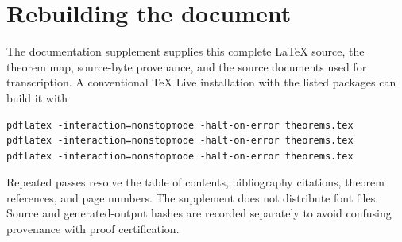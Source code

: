 \documentclass[11pt,letterpaper,oneside]{report}
\theoremstyle{komorebi}
\begin{document}
\section{Rebuilding the document}
The documentation supplement supplies this complete LaTeX source, the theorem map, source-byte provenance, and the source documents used for transcription. A conventional TeX Live installation with the listed packages can build it with
\begin{verbatim}
pdflatex -interaction=nonstopmode -halt-on-error theorems.tex
pdflatex -interaction=nonstopmode -halt-on-error theorems.tex
pdflatex -interaction=nonstopmode -halt-on-error theorems.tex
\end{verbatim}
Repeated passes resolve the table of contents, bibliography citations, theorem references, and page numbers. The supplement does not distribute font files. Source and generated-output hashes are recorded separately to avoid confusing provenance with proof certification.
\end{document}
